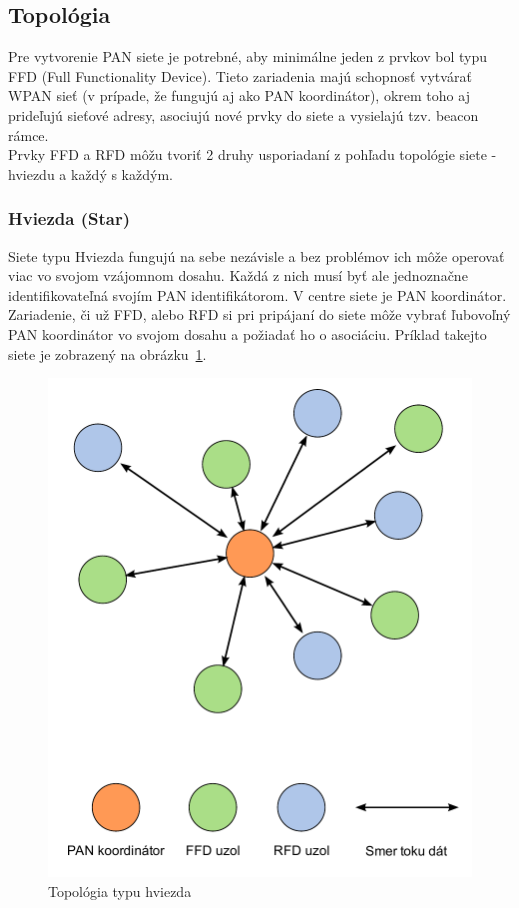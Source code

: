 \subsection{Topológia}

\indent\indent Pre vytvorenie PAN siete je potrebné, aby minimálne jeden z prvkov bol typu FFD (Full Functionality Device). Tieto zariadenia majú schopnosť vytvárať WPAN sieť (v prípade, že fungujú aj ako PAN koordinátor), okrem toho aj prideľujú sieťové adresy, asociujú nové prvky do siete a vysielajú tzv. beacon rámce.\\
\indent Prvky FFD a RFD môžu tvoriť 2 druhy usporiadaní z pohľadu topológie siete - hviezdu a každý s každým.\\

\subsubsection{Hviezda (Star)}
\indent\indent Siete typu Hviezda fungujú na sebe nezávisle a bez problémov ich môže operovať viac vo svojom vzájomnom dosahu. Každá z nich musí byť ale jednoznačne identifikovateľná svojím PAN identifikátorom. V centre siete je PAN koordinátor. Zariadenie, či už FFD, alebo RFD si pri pripájaní do siete môže vybrať ľubovoľný PAN koordinátor vo svojom dosahu a požiadať ho o asociáciu. Príklad takejto siete je zobrazený na obrázku~\ref{fig:topology_star}.\\

\begin{figure}[htbp]
\begin{center}
\includegraphics[width=120mm]{figures/topology_star}
\caption{Topológia typu hviezda}
\label{fig:topology_star}
\end{center}
\end{figure} 

